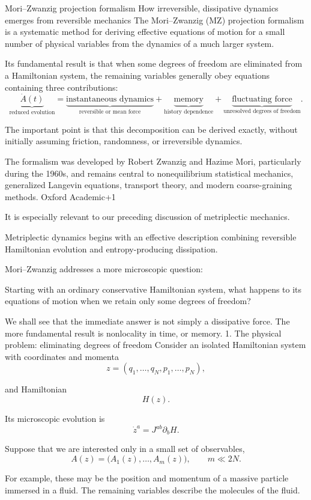 Mori–Zwanzig projection formalism
How irreversible, dissipative dynamics emerges from reversible mechanics
The Mori–Zwanzig (MZ) projection formalism is a systematic method for deriving effective equations of motion for a small number of physical variables from the dynamics of a much larger system.

Its fundamental result is that when some degrees of freedom are eliminated from a Hamiltonian system, the remaining variables generally obey equations containing three contributions:
\[
\boxed{
\underbrace{\dot A(t)}_{\text{reduced evolution}}
=
\underbrace{\text{instantaneous dynamics}}_{\text{reversible or mean force}}
+
\underbrace{\text{memory}}_{\text{history dependence}}
+
\underbrace{\text{fluctuating force}}_{\text{unresolved degrees of freedom}}.
}
\]

The important point is that this decomposition can be derived exactly, without initially assuming friction, randomness, or irreversible dynamics.

The formalism was developed by Robert Zwanzig and Hazime Mori, particularly during the 1960s, and remains central to nonequilibrium statistical mechanics, generalized Langevin equations, transport theory, and modern coarse-graining methods. 
Oxford Academic+1


It is especially relevant to our preceding discussion of metriplectic mechanics.

Metriplectic dynamics begins with an effective description combining reversible Hamiltonian evolution and entropy-producing dissipation.

Mori–Zwanzig addresses a more microscopic question:

Starting with an ordinary conservative Hamiltonian system, what happens to its equations of motion when we retain only some degrees of freedom?

We shall see that the immediate answer is not simply a dissipative force. The more fundamental result is nonlocality in time, or memory.
1. The physical problem: eliminating degrees of freedom
Consider an isolated Hamiltonian system with coordinates and momenta
\[
z=(q_1,\ldots,q_N,p_1,\ldots,p_N),
\]

and Hamiltonian
\[
H(z).
\]

Its microscopic evolution is
\[
\dot z^a=J^{ab}\partial_bH.
\]

Suppose that we are interested only in a small set of observables,
\[
A(z)=\big(A_1(z),\ldots,A_m(z)\big),
\qquad m\ll 2N.
\]

For example, these may be the position and momentum of a massive particle immersed in a fluid. The remaining variables describe the molecules of the fluid.

